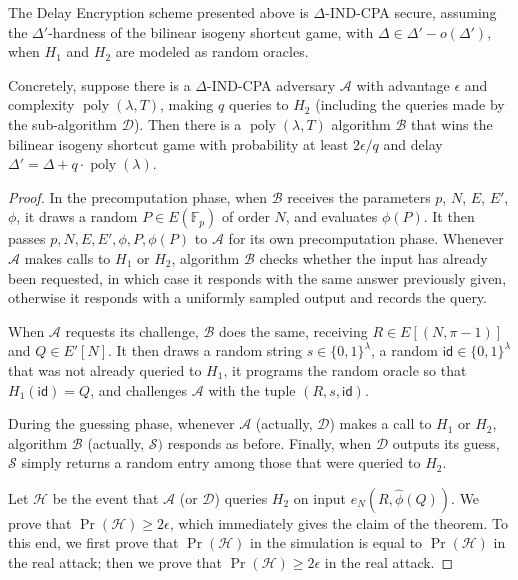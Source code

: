 \documentclass{llncs}
\newcommand{\F}{\mathbb{F}}
\DeclareMathOperator{\poly}{poly}
\newcommand{\id}{\mathsf{id}}
\begin{document}
\begin{theorem}
  The Delay Encryption scheme presented above is $\Delta$-IND-CPA
  secure, assuming the $\Delta'$-hardness of the bilinear isogeny
  shortcut game, with $\Delta\in\Delta' - o(\Delta')$, when $H_1$ and
  $H_2$ are modeled as random oracles.

  Concretely, suppose there is a $\Delta$-IND-CPA adversary
  $\mathcal{A}$ with advantage $\epsilon$ and complexity $\poly(\lambda,T)$,
  making $q$ queries
  to $H_2$ (including the queries made by the sub-algorithm
  $\mathcal{D}$). Then there is a $\poly(\lambda,T)$ algorithm $\mathcal{B}$
  that wins the bilinear isogeny shortcut game with probability at
  least $2\epsilon/q$ and delay $\Delta' = \Delta + q\cdot\poly(\lambda)$.
\end{theorem}
\begin{proof}
  In the precomputation phase, when $\mathcal{B}$ receives the
  parameters $p$, $N$, $E$, $E'$, $\phi$, it draws a random $P\in E(\F_p)$ of
  order $N$, and evaluates $\phi(P)$. %
  It then passes $p,N,E,E',\phi,P,\phi(P)$ to $\mathcal{A}$ for its
  own precomputation phase. %
  Whenever $\mathcal{A}$ makes calls to $H_1$ or $H_2$, algorithm
  $\mathcal{B}$ checks whether the input has already been requested,
  in which case it responds with the same answer previously given,
  otherwise it responds with a uniformly sampled output and records
  the query.

  When $\mathcal{A}$ requests its challenge, $\mathcal{B}$ does the
  same, receiving $R\in E[(N,\pi-1)]$ and $Q\in E'[N]$. %
  It then draws a random string $s\in\{0,1\}^\lambda$, a random
  $\id\in\{0,1\}^\lambda$ that was not already queried to $H_1$, it
  programs the random oracle so that $H_1(\id) = Q$, and challenges
  $\mathcal{A}$ with the tuple $(R,s,\id)$.

  During the guessing phase, whenever $\mathcal{A}$ (actually,
  $\mathcal{D}$) makes a call to $H_1$ or $H_2$, algorithm $\mathcal{B}$
  (actually, $\mathcal{S})$ responds as before. %
  Finally, when $\mathcal{D}$ outputs its guess, $\mathcal{S}$ simply
  returns a random entry among those that were queried to $H_2$.

  Let $\mathcal{H}$ be the event that $\mathcal{A}$ (or $\mathcal{D}$)
  queries $H_2$ on input $e_N(R,\hat\phi(Q))$. %
  We prove that $\Pr(\mathcal{H}) \ge 2\epsilon$, which immediately
  gives the claim of the theorem. %
  To this end, we first prove that $\Pr(\mathcal{H})$ in the
  simulation is equal to $\Pr(\mathcal{H})$ in the real attack; then
  we prove that $\Pr(\mathcal{H})\ge 2\epsilon$ in the real attack.


\end{proof}
\end{document}
